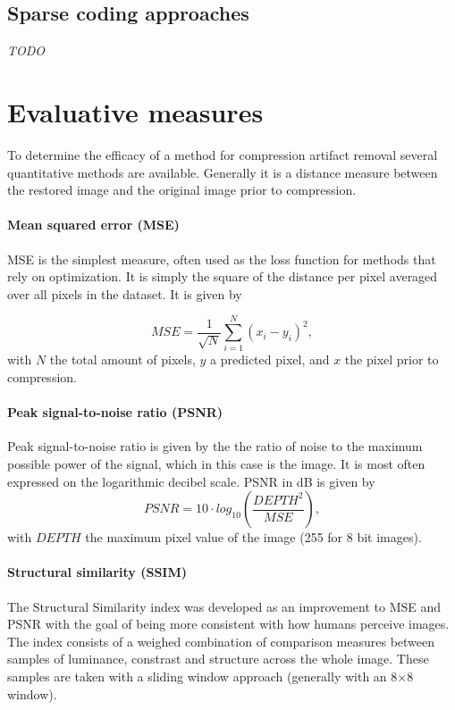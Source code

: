 \subsection{Sparse coding approaches}
\textit{TODO}

\section{Evaluative measures}
To determine the efficacy of a method for compression artifact removal several quantitative methods are available. Generally it is a distance measure between the restored image and the original image prior to compression.

\paragraph{Mean squared error (MSE)}
MSE is the simplest measure, often used as the loss function for methods that rely on optimization. It is simply the square of the distance per pixel averaged over all pixels in the dataset. It is given by

$$
\textit{MSE}= \frac{1}{\sqrt{N}} \sum^N_{i=1}({x}_i - y_i)^2,
$$
with $N$ the total amount of pixels, $y$ a predicted pixel, and ${x}$ the pixel prior to compression.

\paragraph{Peak signal-to-noise ratio (PSNR)}
Peak signal-to-noise ratio is given by the the ratio of noise to the maximum possible power of the signal, which in this case is the image. It is most often expressed on the logarithmic decibel scale. PSNR in dB is given by
$$
\textit{PSNR} = 10 \cdot \textit{log}_{10}(\frac{\textit{DEPTH}^2}{\textit{MSE}}),
$$
with $\textit{DEPTH}$ the maximum pixel value of the image (255 for 8 bit images). 

\paragraph{Structural similarity (SSIM)}
The Structural Similarity index was developed as an improvement to MSE and PSNR with the goal of being more consistent with how humans perceive images\cite{wang2004imagessim}. The index consists of a weighed combination of comparison measures between samples of luminance, constrast and structure across the whole image. These samples are taken with a sliding window approach (generally with an 8$\times$8 window).

